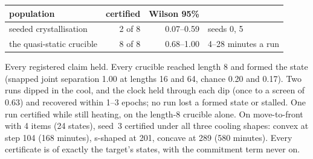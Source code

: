 \documentclass[11pt]{article}
\begin{document}
\begin{center}
\begin{tabular}{lrrl}
\toprule
population & certified & Wilson 95\% & \\
\midrule
seeded crystallisation & 2 of 8 & 0.07--0.59 & seeds 0, 5 \\
the quasi-static crucible & 8 of 8 & 0.68--1.00 & 4--28 minutes a run \\
\bottomrule
\end{tabular}
\end{center}

Every registered claim held. Every crucible reached length 8 and formed the state (snapped joint
separation 1.00 at lengths 16 and 64, chance 0.20 and 0.17). Two runs dipped in the cool, and the
clock held through each dip (once to a screen of 0.63) and recovered within 1--3 epochs; no run lost
a formed state or stalled. One run certified while still heating, on the length-8 crucible alone.
On move-to-front with 4 items (24 states), seed~3 certified under all three cooling shapes: convex
at step 104 (168 minutes), s-shaped at 201, concave at 289 (580 minutes). Every certificate is of
exactly the target's states, with the commitment term never on.
\end{document}
